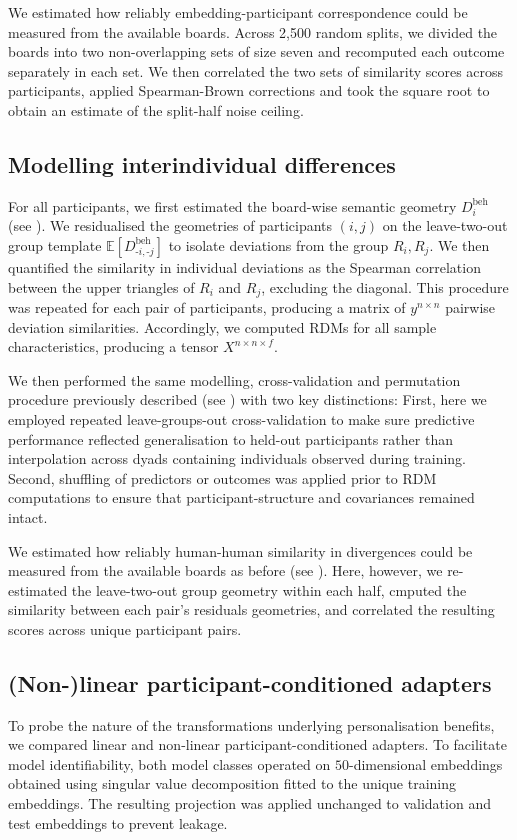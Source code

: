 \documentclass[pdflatex,sn-mathphys]{sn-jnl}
\begin{document}
We estimated how reliably embedding-participant correspondence could be measured from the available boards. Across 2,500 random splits, we divided the boards into two non-overlapping sets of size seven and recomputed each outcome separately in each set. We then correlated the two sets of similarity scores across participants, applied Spearman-Brown corrections and took the square root to obtain an estimate of the split-half noise ceiling\cite{VanBree2025}.

\subsection{Modelling interindividual differences}\label{subsub}
For all participants, we first estimated the board-wise semantic geometry $D_i^{\textrm{beh}}$ (see ). We residualised the geometries of participants $(i, j)$ on the leave-two-out group template $\mathbb{E}\left[D_{\text{-}i,\text{-}j}^{\textrm{beh}}\right]$ to isolate deviations from the group $R_i, R_j$. We then quantified the similarity in individual deviations as the Spearman correlation between the upper triangles of $R_i$ and $R_j$, excluding the diagonal. This procedure was repeated for each pair of participants, producing a matrix of $y^{n\times n}$ pairwise deviation similarities. Accordingly, we computed RDMs for all sample characteristics, producing a tensor $X^{n\times n\times f}$. 

We then performed the same modelling, cross-validation and permutation procedure previously described (see ) with two key distinctions: First, here we employed repeated leave-groups-out cross-validation to make sure predictive performance reflected generalisation to held-out participants rather than interpolation across dyads containing individuals observed during training. Second, shuffling of predictors or outcomes was applied prior to RDM computations to ensure that participant-structure and covariances remained intact.

We estimated how reliably human-human similarity in divergences could be measured from the available boards as before (see ). Here, however, we re-estimated the leave-two-out group geometry within each half, cmputed the similarity between each pair's residuals geometries, and correlated the resulting scores across unique participant pairs. 

\subsection{(Non-)linear participant-conditioned adapters}\label{nonlinear}
To probe the nature of the transformations underlying personalisation benefits, we compared linear and non-linear participant-conditioned adapters. To facilitate model identifiability, both model classes operated on $50$-dimensional embeddings obtained using singular value decomposition fitted to the unique training embeddings. The resulting projection was applied unchanged to validation and test embeddings to prevent leakage. 
\end{document}
